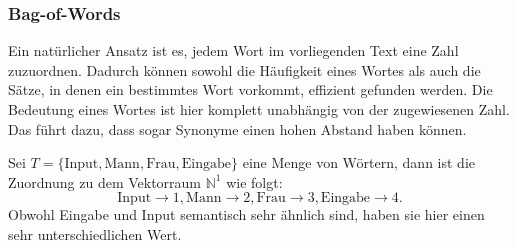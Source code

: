 \documentclass[12pt,letterpaper,ngerman]{article}
\begin{document}
\subsubsection{Bag-of-Words}
Ein natürlicher Ansatz ist es, jedem Wort im vorliegenden Text eine Zahl 
zuzuordnen. Dadurch können sowohl die Häufigkeit eines Wortes als auch
die Sätze, in denen ein bestimmtes Wort vorkommt, effizient gefunden 
werden. Die Bedeutung eines Wortes ist hier komplett unabhängig von 
der zugewiesenen Zahl. Das führt dazu, dass sogar Synonyme einen
hohen Abstand haben können.
\pagebreak
\begin{example}
  Sei $T = \{\text{Input}, \text{Mann}, \text{Frau},
   \text{Eingabe}\}$ eine Menge von Wörtern, dann ist die Zuordnung
  zu dem Vektorraum $\mathbb{N}^1$ wie folgt:
  \[
    \text{Input} \to 1, 
    \text{Mann} \to 2, 
    \text{Frau} \to 3,
    \text{Eingabe} \to 4.
  \]
  Obwohl Eingabe und Input semantisch sehr ähnlich sind, haben sie hier
  einen sehr unterschiedlichen Wert.
\end{example}
\end{document}
